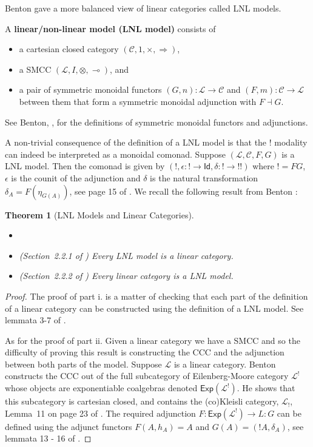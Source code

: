 \documentclass{elsarticle}
\newcommand{\cat}[1]{\mathcal{#1}}
\newcommand{\limp}[0]{\multimap}
\newtheorem{theorem}{Theorem}
\begin{document}
Benton gave a more balanced view of linear categories called LNL
models.
\begin{definition}
  \label{def:LNL-model}
  A \textbf{linear/non-linear model (LNL model)} consists of
  \begin{itemize}
  \item a cartesian closed category $(\cat{C}, 1, \times,
    \Rightarrow)$,
  \item a SMCC $(\cat{L},I,\otimes,\limp)$, and
  \item a pair of symmetric monoidal functors $(G,n) : \cat{L} \to
    \cat{C}$ and $(F,m) : \cat{C} \to \cat{L}$ between them that form
    a symmetric monoidal adjunction with $F \dashv G$.
  \end{itemize}
  See Benton, \cite{Benton:1994}, for the definitions of symmetric
  monoidal functors and adjunctions.
\end{definition}
A non-trivial consequence of the definition of a LNL model is that the
$!$ modality can indeed be interpreted as a monoidal comonad.  Suppose
$(\cat{L}, \cat{C},F,G)$ is a LNL model. Then the comonad is given by
$(\mathop{!}, \epsilon : \mathop{!} \to \mathsf{Id}, \delta :
\mathop{!} \to \mathop{!!})$
where $! = FG$, $\epsilon$ is the counit of the adjunction and
$\delta$ is the natural transformation $\delta_A = F(\eta_{G(A)})$,
see page 15 of \cite{Benton:1994}.  We recall the following result
from Benton \cite{Benton:1994}:
\begin{theorem}[LNL Models and Linear Categories]
  \label{thm:lnl_models_are_linear_categories}
  \begin{itemize}
  \item[]
  \item[i.] (Section~2.2.1 of \cite{Benton:1994}) Every LNL model is a linear category.
  \item[ii.] (Section~2.2.2 of \cite{Benton:1994}) Every linear category is a LNL model.
  \end{itemize}
\end{theorem}
\begin{proof}
  The proof of part i. is a matter of checking that each part of the
  definition of a linear category can be constructed using the
  definition of a LNL model. See lemmata 3-7 of \cite{Benton:1994}.

  As for the proof of part ii. Given a linear category we have a SMCC and so the difficulty of
  proving this result is constructing the CCC and the adjunction
  between both parts of the model.  Suppose $\cat{L}$ is a linear
  category.  Benton constructs the CCC out of the full subcategory of
  Eilenberg-Moore category $\cat{L}^!$ whose objects are exponentiable
  coalgebras denoted $\mathsf{Exp}(\cat{L}^!)$.  He shows that
  this subcategory is cartesian closed, and contains the (co)Kleisli
  category, $\cat{L}_!$, Lemma~11 on page 23 of \cite{Benton:1994}.
  The required adjunction
  $F : \mathsf{Exp}(\cat{L}^!) \to L : G$ can be defined using the
  adjunct functors $F(A,h_A) = A$ and $G(A) = (!A,\delta_A)$, see
  lemmata 13 - 16 of \cite{Benton:1994}.
\end{proof}
\end{document}
